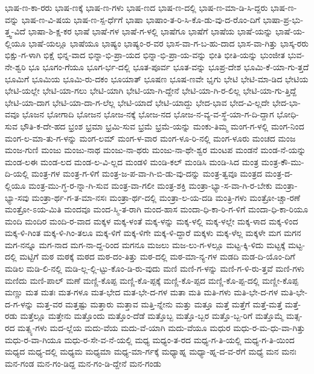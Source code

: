 {ಭಾಷ-ಣ-ಕಾ-ರರು
ಭಾಷ-ಣಕ್ಕೆ
ಭಾಷ-ಣ-ಗಳು
ಭಾಷ-ಣದ
ಭಾಷ-ಣ-ದಲ್ಲಿ
ಭಾಷ-ಣ-ಮಾ-ಡಿ-ಸಿ-ದ್ದರು
ಭಾಷ-ಣ-ವನ್ನು
ಭಾಷ-ಣ-ವಿ-ಷಯ
ಭಾಷ-ಣ-ಸ್ಪ-ರ್ಧೆಗೆ
ಭಾಷಾ
ಭಾಷಾಂ-ತ-ರಿ-ಸಿ-ಕೊ-ಡು-ವು-ದ-ರೊಂ-ದಿಗೆ
ಭಾಷಾ-ಪ್ರ-ಭು-ತ್ತ್ವ-ವಿದೆ
ಭಾಷಾ-ಶಿ-ಕ್ಷ-ಕರ
ಭಾಷೆ
ಭಾಷೆ-ಗಳ
ಭಾಷೆ-ಗ-ಳಲ್ಲಿ
ಭಾಷೆಗೂ
ಭಾಷೆಗೆ
ಭಾಷೆಯ
ಭಾಷೆ-ಯನ್ನು
ಭಾಷೆ-ಯ-ಲ್ಲಿಯೂ
ಭಾಷೆ-ಯಲ್ಲೂ
ಭಾಷೆಯೂ
ಭಾಷ್ಯಂ
ಭಾಷ್ಯಂ-ರ-ವರ
ಭಾಸ-ವಾ-ಗ-ಬ-ಹು-ದಾದ
ಭಾಸ-ವಾ-ಗಿತ್ತು
ಭಾಸ್ಕ-ರರು
ಭಿಕ್ಷು-ಗ-ಳಾಗಿ
ಭಿಕ್ಷೆ
ಭಿನ್ನ-ವಾದ
ಭಿನ್ನಾ-ಭಿ-ಪ್ರಾ-ಯದ
ಭಿನ್ನಾ-ಭಿ-ಪ್ರಾ-ಯ-ವನ್ನು
ಭೀತಿ
ಭೀತಿ-ಯನ್ನು
ಭುಂಜೀತ
ಭುವ-ನೇ-ಶ್ವರಿ
ಭೂ
ಭೂಗಂ-ಗೆಯೂ
ಭೂಗ-ರ್ಭ-ದಲ್ಲಿ
ಭೂತ-ಪೂರ್ವ
ಭೂತ-ವನ್ನು
ಭೂಪ್ರ-ದೇಶ
ಭೂಮಿ-ಕೆ-ಯಾ-ಗು-ತ್ತದೆ
ಭೂಮಿಗೆ
ಭೂಮಿಯ
ಭೂಮಿ-ರು-ದಕಂ
ಭೂಯಾತ್
ಭೂಷಣ
ಭೂಷ-ಣವೇ
ಭೃಗು
ಭೇಟಿ
ಭೇಟಿ-ಮಾ-ಡಿದ
ಭೇಟಿಯ
ಭೇಟಿ-ಯಲ್ಲೇ
ಭೇಟಿ-ಯಾ-ಗಲು
ಭೇಟಿ-ಯಾಗಿ
ಭೇಟಿ-ಯಾ-ಗಿ-ದ್ದೇನೆ
ಭೇಟಿ-ಯಾ-ಗಿ-ರ-ಲಿಲ್ಲ
ಭೇಟಿ-ಯಾ-ಗು-ತ್ತಿದ್ದೆ
ಭೇಟಿ-ಯಾ-ದಾಗ
ಭೇಟಿ-ಯಾ-ದಾ-ಗ-ಲೆಲ್ಲ
ಭೇಟಿ-ಯಾದೆ
ಭೇಟಿ-ಯಾದ್ದು
ಭೇದ-ಭಾವ
ಭೇದ-ವಿ-ಲ್ಲದೇ
ಭೇದ-ಭಾ-ವವೂ
ಭೊಜನ
ಭೋಗಾದಿ
ಭೋಜನ
ಭೋಜ-ನಕ್ಕೆ
ಭೋಜ-ನದ
ಭೋಜ-ನ-ವ್ಯ-ವ-ಸ್ಥೆ-ಯಾ-ಗ-ದಿ-ದ್ದಾಗ
ಭೋಧಿ-ಸುವ
ಭೌತಿ-ಕ-ದೇ-ಹದ
ಭ್ರಂಶ
ಭ್ರಮಾ
ಭ್ರಮಿ-ಸುವ
ಭ್ರಮೆ
ಭ್ರಮೆ-ಯನ್ನು
ಮಂಕು-ತಿಮ್ಮ
ಮಂಗ-ಗ-ಳಲ್ಲಿ
ಮಂಗ-ನಿಂದ
ಮಂಗ-ಲ-ಮಾ-ತು-ಗ-ಳನ್ನು
ಮಂಗ-ಲಮ್
ಮಂಗ-ಳ-ವಾರ
ಮಂಗ-ಳೂ-ರಿ-ನಲ್ಲಿ
ಮಂಗ-ಳೂರು
ಮಂಚದ
ಮಂಜ
ಮಂಜ-ಗುಣಿ
ಮಂಜು
ಮಂಜು-ನಾಥ
ಮಂಜು-ನಾ-ಥರು
ಮಂಜು-ನಾ-ಥೇ-ಶ್ವರ
ಮಂಟಪ
ಮಂಡನೆ
ಮಂಡ-ನೆ-ಯನ್ನು
ಮಂಡ-ಲಈ
ಮಂಡ-ಲದ
ಮಂಡ-ಲ-ವಿ-ಲ್ಲದ
ಮಂಡಳಿ
ಮಂಡಿ-ಕಲ್
ಮಂಡಿಸಿ
ಮಂಡಿ-ಸಿದ
ಮಂತ್ರ
ಮಂತ್ರ-ಕೌ-ಮು-ದಿ-ಯಲ್ಲಿ
ಮಂತ್ರ-ಗಳ
ಮಂತ್ರ-ಗ-ಳಿಗೆ
ಮಂತ್ರ-ಜ-ಪ-ವಾ-ಗಿ-ಬಿ-ಡು-ವು-ದನ್ನು
ಮಂತ್ರ-ತ್ವವೂ
ಮಂತ್ರದ
ಮಂತ್ರ-ದ-ಲ್ಲಿಯೂ
ಮಂತ್ರ-ಮು-ಗ್ಧ-ರ-ನ್ನಾ-ಗಿ-ಸುವ
ಮಂತ್ರ-ವಾ-ಗಲೀ
ಮಂತ್ರ-ಶಕ್ತಿ
ಮಂತ್ರಾ-ಭ್ಯಾ-ಸ-ವಾ-ಗಿ-ರ-ಬೇಕು
ಮಂತ್ರಾ-ಭ್ಯಾ-ಸವು
ಮಂತ್ರಾ-ರ್ಥ-ಗ-ತ-ಮಾ-ನಸಃ
ಮಂತ್ರಾ-ರ್ಥ-ದಲ್ಲಿ
ಮಂತ್ರಾ-ಲ-ಯ-ದಡಿ
ಮಂತ್ರಿ-ಗಳು
ಮಂತ್ರೋ-ಚ್ಚಾ-ರಣೆ
ಮಂತ್ರೋ-ಽಯ-ಮಿತಿ
ಮಂದವೂ
ಮಂದ-ಸ್ಮಿ-ತ-ರಾಗಿ
ಮಂದ-ಹಾಸ
ಮಂದಾ-ಧಿ-ಕಾ-ರಿ-ಗ-ಳಿಗೆ
ಮಂದಾ-ಧಿ-ಕಾ-ರಿಯೂ
ಮಂದಿ
ಮಂದಿರ
ಮಂದಿ-ರ-ವಾದ
ಮಕ್ಕಳ
ಮಕ್ಕ-ಳಂತೆ
ಮಕ್ಕ-ಳನ್ನು
ಮಕ್ಕ-ಳಲ್ಲಿ
ಮಕ್ಕ-ಳಲ್ಲೇ
ಮಕ್ಕ-ಳಾದ
ಮಕ್ಕ-ಳಿಂದ
ಮಕ್ಕ-ಳಿ-ಗಿಂತ
ಮಕ್ಕ-ಳಿ-ಗಿಂ-ತಲೂ
ಮಕ್ಕ-ಳಿಗೆ
ಮಕ್ಕ-ಳಿಗೇ
ಮಕ್ಕ-ಳಿ-ದ್ದಾರೆ
ಮಕ್ಕಳು
ಮಕ್ಕ-ಳೆಲ್ಲ
ಮಕ್ಕಳೇ
ಮಗ
ಮಗನ
ಮಗ-ನನ್ನೂ
ಮಗ-ನಾದ
ಮಗ-ನಾ-ದ್ದ-ರಿಂದ
ಮಗನೂ
ಮಜಲು
ಮಜ-ಲು-ಗ-ಳಲ್ಲೂ
ಮಟ್ಟ-ಕ್ಕಿ-ಳಿದು
ಮಟ್ಟಕ್ಕೆ
ಮಟ್ಟ-ದಲ್ಲಿ
ಮಟ್ಟಿಗೆ
ಮಠ
ಮಠಕ್ಕೆ
ಮಠದ
ಮಠ-ದಂ-ತಿತ್ತು
ಮಠ-ದಲ್ಲಿ
ಮಠ-ಮಾ-ನ್ಯ-ಗಳ
ಮಡದಿ
ಮಡ-ದಿ-ಯೊಂ-ದಿಗೆ
ಮಡಿಲ
ಮಡಿ-ಲಿ-ನಲ್ಲಿ
ಮಡಿ-ಲ್ಲ-ಲ್ಲಿ-ಟ್ಟು-ಕೊಂ-ಡಿ-ರು-ವುದು
ಮಣಿ
ಮಣಿ-ಗ-ಳನ್ನು
ಮಣಿ-ಗ-ಳಿ-ರು-ತ್ತವೆ
ಮಣಿ-ಗಳು
ಮಣಿದು
ಮಣಿ-ಪಾಲ್
ಮಣೆ
ಮಣ್ಣಿ-ಕೊಪ್ಪ
ಮಣ್ಣಿ-ಕೊ-ಪ್ಪಕ್ಕೆ
ಮಣ್ಣಿ-ಕೊ-ಪ್ಪದ
ಮಣ್ಣಿ-ಕೊ-ಪ್ಪ-ದಲ್ಲಿ
ಮಣ್ಣೀ-ಕೊಪ್ಪ
ಮಣ್ಣು
ಮತ
ಮತಃ
ಮತ-ಗಳೂ
ಮತ-ಭೇದ
ಮತ-ಭೇ-ದ-ಗಳ
ಮತಾ
ಮತಿ
ಮತಿ-ಗಳು
ಮತಿ-ಭೇ-ದ-ಗಳ
ಮತಿ-ಭೇ-ದ-ಗ-ಳನ್ನು
ಮತ್ತ-ವರ
ಮತ್ತಷ್ಟು
ಮತ್ತಾರು
ಮತ್ತಾವ
ಮತ್ತಿ-ನ್ನೇನು
ಮತ್ತು
ಮತ್ತೂ
ಮತ್ತೆ
ಮತ್ತೆಗೆ
ಮತ್ತೆ-ಮತ್ತೆ
ಮತ್ತೆ-ರಡು
ಮತ್ತೆಲ್ಲೂ
ಮತ್ತೇನು
ಮತ್ತೊಂದು
ಮತ್ತೊಂ-ದೆಡೆ
ಮತ್ತೊಬ್ಬ
ಮತ್ತೊ-ಬ್ಬರ
ಮತ್ತೊ-ಬ್ಬ-ರಿಗೆ
ಮತ್ತೊಮ್ಮೆ
ಮತ್ಸ-ರದ
ಮತ್ಸ್ಯ-ಗಳು
ಮದ-ಲ್ಲೆಯ
ಮದು-ವೆಯ
ಮದು-ವೆ-ಯಾಗಿ
ಮದು-ವೆಯೂ
ಮಧುರ
ಮಧು-ರ-ಮ-ಧು-ವಾ-ಗಿತ್ತು
ಮಧು-ರ-ವಾ-ಗಿಯೂ
ಮಧು-ರ-ಸೇ-ವ-ನೆ-ಯಲ್ಲಿ
ಮಧ್ಯ
ಮಧ್ಯಂ-ತ-ರದ
ಮಧ್ಯ-ಗ-ತಿ-ಯಲ್ಲಿ
ಮಧ್ಯ-ಗ-ತಿ-ಯಿಂದ
ಮಧ್ಯದ
ಮಧ್ಯ-ದಲ್ಲಿ
ಮಧ್ಯಮ
ಮಧ್ಯಮಾ
ಮಧ್ಯ-ಮಾ-ರ್ಗಕ್ಕೆ
ಮಧ್ಯಾಹ್ನ
ಮಧ್ಯಾ-ಹ್ನ-ದ-ವ-ರೆಗೆ
ಮಧ್ಯೆ
ಮನ
ಮನಃ
ಮನ-ಗಂಡ
ಮನ-ಗಂ-ಡಿದ್ದ
ಮನ-ಗಂ-ಡಿ-ದ್ದೇನೆ
ಮನ-ಗಂಡು
}
